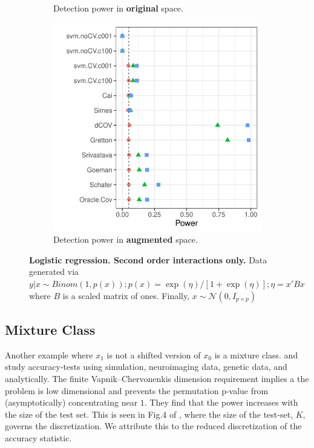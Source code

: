 \documentclass[]{bio}
\begin{document}
\begin{figure}[th]
\begin{subfigure}[t]{.3\columnwidth}
	\caption{Detection power in \textbf{original} space.} 
	\label{fig:logistic-interactions-only-original}
	\end{subfigure}
	\begin{subfigure}[t]{.3\columnwidth}
	\centering
	\includegraphics[width=1\columnwidth]{"art/file43"}
	\caption{Detection power in \textbf{augmented} space.} 
	\label{fig:logistic-interactions-only-augmented}
	\end{subfigure}
	\caption{\textbf{Logistic regression. Second order interactions only.}
		Data generated via $y|x \sim Binom(1,p(x));
		p(x)=\exp(\eta)/[1+\exp(\eta)];
		\eta=x'Bx$ where $B$ is a scaled matrix of ones.
		Finally, $x\sim \mathcal{N}(0,I_{p\times p})$
	}
	\label{fig:logistic-interactions-only}
\end{figure}







\subsection{Mixture Class}

Another example where $x_1$ is not a shifted version of $x_0$ is a mixture class. 
\cite{golland_permutation_2003} and \cite{golland_permutation_2005} study accuracy-tests using simulation, neuroimaging data, genetic data, and analytically.
The finite Vapnik–Chervonenkis dimension requirement \cite[Sec 4.3]{golland_permutation_2005} implies a the problem is low dimensional and prevents the permutation p-value from (asymptotically) concentrating near $1$. 
They find that the power increases with the size of the test set.
This is seen in Fig.4 of \cite{golland_permutation_2005}, where the size of the test-set, $K$, governs the discretization. 
We attribute this to the reduced discretization of the accuracy statistic.
\end{document}
